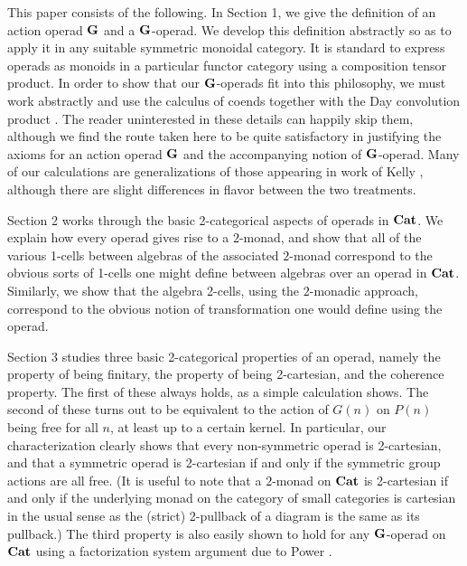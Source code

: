 This paper consists of the following.  In Section 1, we give the definition of an action operad $\mathbf{G}$ and a $\mathbf{G}$-operad.  We develop this definition abstractly so as to apply it in any suitable symmetric monoidal category.   It is standard to express operads as monoids in a particular functor category using a composition tensor product.  In order to show that our $\mathbf{G}$-operads fit into this philosophy, we must work abstractly and use the calculus of coends together with the Day convolution product \cite{day-thesis}.  The reader uninterested in these details can happily skip them, although we find the route taken here to be quite satisfactory in justifying the axioms for an action operad $\mathbf{G}$ and the accompanying notion of $\mathbf{G}$-operad.  Many of our calculations are generalizations of those appearing in work of Kelly \cite{kelly-op}, although there are slight differences in flavor between the two treatments.

Section 2 works through the basic 2-categorical aspects of operads in $\mathbf{Cat}$.  We explain how every operad gives rise to a $2$-monad, and show that all of the various 1-cells between algebras of the associated $2$-monad correspond to the obvious sorts of 1-cells one might define between algebras over an operad in $\mathbf{Cat}$.  Similarly, we show that the algebra 2-cells, using the $2$-monadic approach, correspond to the obvious notion of transformation one would define using the operad.

Section 3 studies three basic 2-categorical properties of an operad, namely the property of being finitary, the property of being 2-cartesian, and the coherence property.  The first of these always holds, as a simple calculation shows.  The second of these turns out to be equivalent to the action of $G(n)$ on $P(n)$ being free for all $n$, at least up to a certain kernel.  In particular, our characterization clearly shows that every non-symmetric operad is 2-cartesian, and that a symmetric operad is 2-cartesian if and only if the symmetric group actions are all free.  (It is useful to note that a $2$-monad on $\mathbf{Cat}$ is 2-cartesian if and only if the underlying monad on the category of small categories is cartesian in the usual sense as the (strict) 2-pullback of a diagram is the same as its pullback.)  The third property is also easily shown to hold for any $\mathbf{G}$-operad on $\mathbf{Cat}$ using a factorization system argument due to Power \cite{power-gen}.

